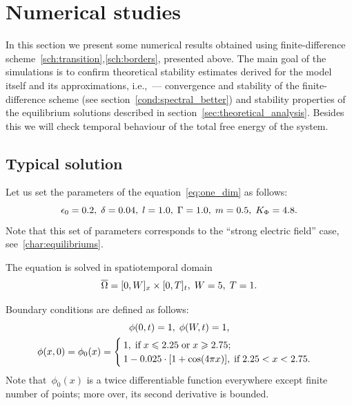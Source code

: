 
\section{Numerical studies}
\label{sec:computational_analysis}

In this section we present some numerical results
obtained using finite-difference
scheme~\eqref{sch:transition},\eqref{sch:borders},
presented above. The main goal of the simulations is to confirm
theoretical stability estimates derived for the model itself and its
approximations,
i.e.,~--- convergence and stability  of the finite-difference scheme
(see section~\eqref{cond:spectral_better})
and
stability properties of the equilibrium solutions
described in section~\ref{sec:theoretical_analysis}.
Besides this we will check temporal behaviour of the
total free energy of the system.

\subsection{Typical solution}

Let us set the parameters of the equation~\eqref{eq:one_dim} as follows:
\begin{equation}
	\epsilon_0 = 0.2, \; \delta = 0.04, \; l = 1.0, \; \Gamma = 1.0, \; m = 0.5, \; K_\Phi = 4.8 {\text{.}}
	\label{exp:parameters}
\end{equation}
Note that this set of parameters corresponds to the ``strong electric
field'' case, see~\eqref{char:equilibriums}.

The equation is solved in spatiotemporal domain
\begin{equation}
	{\overline{\Omega}} = [0, W]_x \times [0, T]_t, \; W = 5, \; T = 1 {\text{.}}
	\label{exp:set}
\end{equation}

Boundary conditions are defined as follows:
\begin{equation}
\begin{gathered}
  \phi(0, t) = 1, \; \phi(W, t) = 1 {\text{,}} \\
  \phi(x, 0) = \phi_0(x) = \begin{cases}
    1, \; \text{if} \; x \leqslant 2.25 \; \text{or} \; x \geqslant 2.75 {\text{;}} \\
    1 - 0.025 \cdot [1 + \cos(4 \pi x)], \; \text{if} \; 2.25 < x < 2.75 {\text{.}}
  \end{cases}
\end{gathered} \label{exp:borders}
\end{equation}
Note that~$\phi_0(x)$ is a twice differentiable function everywhere
except finite number of points; more over, its second derivative is bounded.

